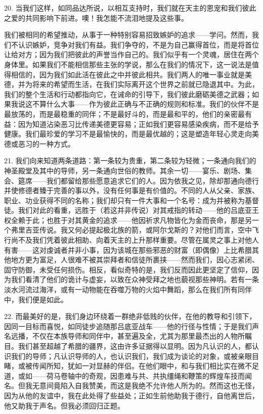 20. 当我们这样，如同品达所说，以相互支持时，我们就在天主的恩宠和我们彼此之爱的共同影响下前进。噢！我怎能不流泪地提及这些事。\par

我们被相同的希望推动，从事于一种特别容易招致嫉妒的追求——学问。然而，我们不认识嫉妒，竞争对我们有益。我们争夺的，不是为自己赢得首位，而是将首位让给对方；因为我们把彼此的声誉当作自己的。我们似乎有一个灵魂，居住在两个身体里。如果我们不能相信那些主张的学说，那么在我们的情况下，这一说法是值得相信的，因为我们如此活在彼此之中并彼此相共。我们两人的唯一事业就是美德，并为将来的希望而生活，在我们实际离开这个世界之前就已隐退其中。为此，我们的整个生活和行动都指向它，在诫命的引导下，我们彼此磨砺美德之武器；如果我说这不算什么大事——作为彼此正确与不正确的规则和标准。我们的伙伴不是最放荡的，而是最稳重的同伴；不是最好斗的，而是最和平的，他们的亲密最有益：因为知道沾染恶习比传递美德更容易；正如我们更容易感染疾病，而不是给予健康。我们最珍爱的学习不是最愉快的，而是最优越的；这是塑造年轻心灵走向美德或恶习的一种方式。\par

21. 我们向来知道两条道路：第一条较为贵重，第二条较为轻微；一条通向我们的神圣殿堂及其中的导师，另一条通向世俗的教师。其余一切——宴乐、剧场、集会、筵席——我们都留给那些愿意追求它们的人。因为依我之见，除却那通向德行并使修德者臻于完善的事以外，没有任何事是有价值的。不同的人从父亲、家族、职业、功业获得不同的名称；我们却只有一件大事和一个名号：成为并被称为基督徒。我们对此的看重，远胜于（若这并非传说）对其戒指的转动——他的吕底亚王权全赖于此；也胜于对其黄金的追求——他因祈求凡物皆化为金而丧命，那是另一个弗里吉亚传说。我又何必提起极北族的箭，或阿尔戈斯的？对他们而言，空中飞行尚不及我们凭着彼此相助、向着天主的上升那样重要。尽管在属灵之事上对他人有害——这对虔诚者并非小事，因为该城在那些邪恶的财富（即偶像）上比希腊其他地方更为富足，人很难不被其崇拜者和信徒所裹挟——然而我们，因心志紧闭、固守防御，未受任何损伤。相反，看似奇特的是，我们反而因此更坚定了信仰，因为我们看清了他们的诡计与虚妄，以致在众神受拜之地也藐视那些神明。若有一条淡水河流过海洋，或有一动物能在吞噬万物的火焰中舞蹈，那么在我们所有同伴中，我们便是如此。\par

22. 而最美好的是，我们身边环绕着一群绝非低贱的伙伴，在他的教导和引领下，因同一目标而喜悦，如同徒步追随那吕底亚战车——他的行径与性情；于是我们声名远播，不仅在本族导师和同伴中，甚至遍及全，尤其为那里最杰出的人物所瞩目。我们甚至超越了希腊的疆界，这由许多证据得以显明。因为凡认识的人，都认识我们的导师；凡认识导师的人，也认识我们，我们成为谈论的对象，或被亲眼目睹，或被传闻所知，犹如一对显赫的伴侣。在他们眼中，和与我们相比实在微不足道，或如——荷马卷轴中的奇观，因患难与共、共执缰绳和鞭策的辉煌车技而闻名。但我无意间竟陷入自我赞美，而这是我绝不允许他人所为的。然而这也无怪，因为从他的友谊中，我在此处得了些益处；正如生前他助我于德行，自他离世后，他又助我于声名。但我必须回归正题。\par

